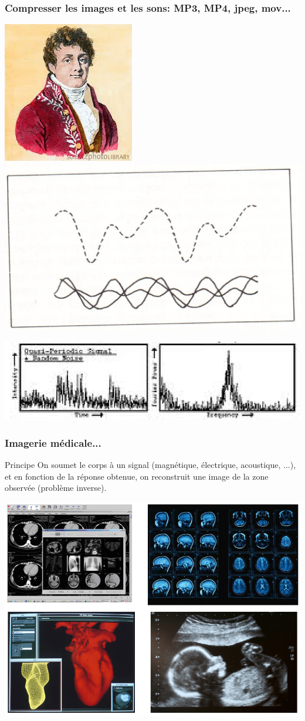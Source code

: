 \documentclass[slideopt,A4]{beamer}
\begin{document}
%
\begin{frame}
\frametitle{Compresser les images et les sons: MP3, MP4, jpeg, mov...}
%
\includegraphics[width=0.3\linewidth]{fourier} $\qquad$
\includegraphics[width=0.5\linewidth, angle=-1.5]{fourier4} \\[5mm]
\centerline{\includegraphics[width=0.6\linewidth]{fourier2}}
%
\end{frame}
%

%
\begin{frame}
\frametitle{Imagerie médicale...}
\small
%
%
\begin{block}{Principe}
On soumet le corps à un signal (magnétique, électrique, acoustique, ...), et en fonction de la réponse obtenue, on reconstruit  une image de la zone observée (problème inverse).
\end{block}
%
\centerline{\includegraphics[width=0.7\linewidth]{imagerie-medicale.png}}
%
\end{frame}
%
\end{document}
